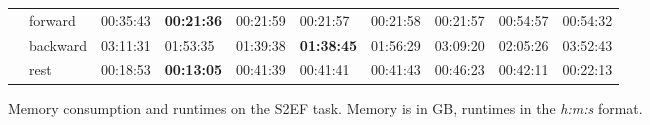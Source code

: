 \begin{figure}[H]
{\begin{tabular}{ll|l|l|l|l|l|l|l|l|}
    \multicolumn{1}{|l|}{}                          & forward     & 00:35:43 & \textbf{00:21:36} & 00:21:59       & 00:21:57          & 00:21:58 & 00:21:57      & 00:54:57 & 00:54:32          \\ \cline{2-10} 
    \multicolumn{1}{|l|}{}                          & backward    & 03:11:31 & 01:53:35          & 01:39:38       & \textbf{01:38:45} & 01:56:29 & 03:09:20      & 02:05:26 & 03:52:43          \\ \cline{2-10} 
    \multicolumn{1}{|l|}{}                          & rest        & 00:18:53 & \textbf{00:13:05} & 00:41:39       & 00:41:41          & 00:41:43 & 00:46:23      & 00:42:11 & 00:22:13          \\ \hline
    \end{tabular}}

    \captionsetup{width=\dimexpr\textwidth-1.5cm\relax}
    \caption{Memory consumption and runtimes on the S2EF task. 
    Memory is in GB, runtimes in the \textit{h:m:s} format.}
    \label{fig:gemnet-s2ef}
    
\end{figure}

